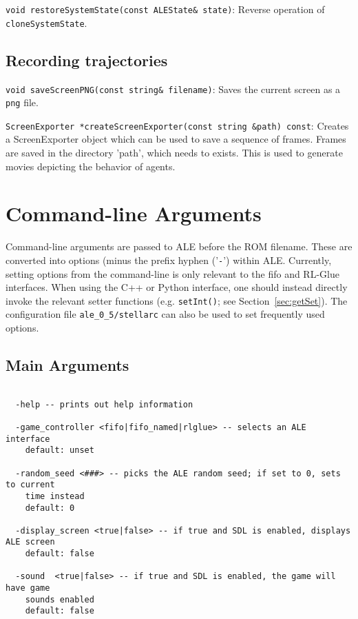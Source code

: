 \documentclass[12pt]{article}
\begin{document}
  \verb+void restoreSystemState(const ALEState& state)+: Reverse operation of \verb+cloneSystemState+.
  \subsection{Recording trajectories}
   
  \indent \indent \verb+void saveScreenPNG(const string& filename)+: Saves the current screen as
  a \verb+png+ file.
  
  \verb+ScreenExporter *createScreenExporter(const string &path) const+: Creates a 
  ScreenExporter object which can be used to save a sequence of frames. Frames are saved 
  in the directory 'path', which needs to exists. This is used to generate movies depicting the behavior
  of agents.
  
\section{Command-line Arguments}\label{sec:arguments}

Command-line arguments are passed to ALE before the ROM filename. These are converted into
options (minus the prefix hyphen ('\verb+-+') within ALE. Currently, 
setting options from the command-line is only relevant to the fifo and RL-Glue interfaces.
When using the C++ or Python interface, one should instead directly invoke the relevant setter
functions (e.g. \verb+setInt()+; see Section~\ref{sec:getSet}). The configuration file 
\verb+ale_0_5/stellarc+ can also be used to set frequently used options. 

\subsection{Main Arguments}
\small{
\begin{verbatim}

  -help -- prints out help information

  -game_controller <fifo|fifo_named|rlglue> -- selects an ALE interface
    default: unset

  -random_seed <###> -- picks the ALE random seed; if set to 0, sets to current 
    time instead 
    default: 0 

  -display_screen <true|false> -- if true and SDL is enabled, displays ALE screen
    default: false
    
  -sound  <true|false> -- if true and SDL is enabled, the game will have game
    sounds enabled
    default: false


\end{verbatim}
}
\end{document}
